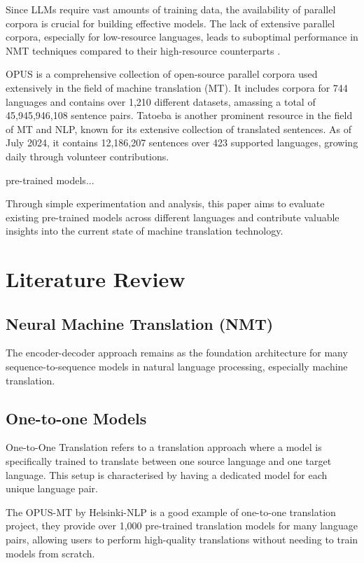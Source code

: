 \documentclass[a4paper]{article}
\begin{document}
Since LLMs require vast amounts of training data, the availability of parallel corpora is crucial for building effective models. The lack of extensive parallel corpora, especially for low-resource languages, leads to suboptimal performance in NMT techniques compared to their high-resource counterparts \cite{ranathunga-2023-nmt-low-res}.


OPUS \cite{opus} is a comprehensive collection of open-source parallel corpora used extensively in the field of machine translation (MT). It includes corpora for 744 languages and contains over 1,210 different datasets, amassing a total of 45,945,946,108 sentence pairs. Tatoeba \cite{tatoeba} is another prominent resource in the field of MT and NLP, known for its extensive collection of translated sentences. As of July 2024, it contains 12,186,207 sentences over 423 supported languages, growing daily through volunteer contributions.

pre-trained models...


Through simple experimentation and analysis, this paper aims to evaluate existing pre-trained models across different languages
and contribute valuable insights into the current state of machine translation technology.

\section{Literature Review}

\subsection{Neural Machine Translation (NMT)}

The encoder-decoder approach \cite{cho-2014-properties} remains as the foundation architecture for many sequence-to-sequence models in natural language processing, especially machine translation.


\subsection{One-to-one Models}

One-to-One Translation refers to a translation approach where a model is specifically trained to translate between one source language and one target language. This setup is characterised by having a dedicated model for each unique language pair.

The OPUS-MT by Helsinki-NLP \cite{tiedemann-2020-opus-mt} is a good example of one-to-one translation project, they provide over 1,000 pre-trained translation models for many language pairs, allowing users to perform high-quality translations without needing to train models from scratch.
\end{document}
